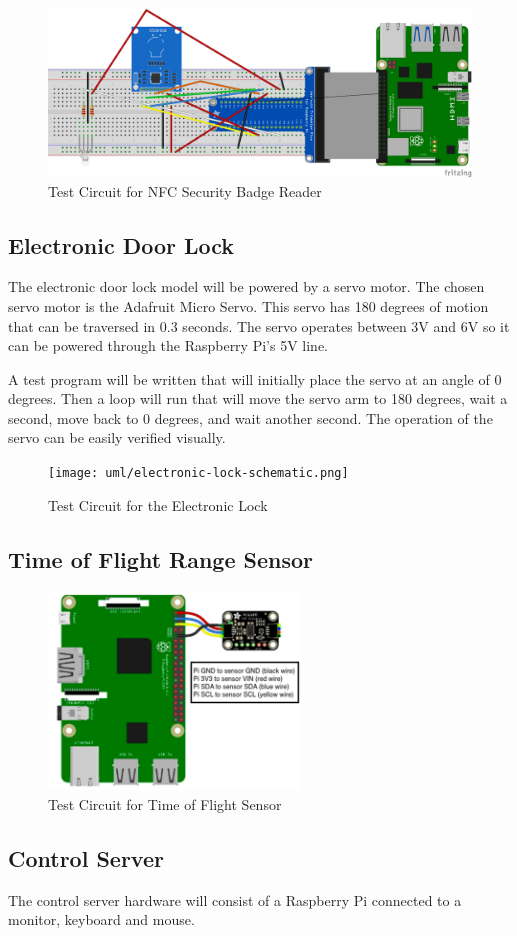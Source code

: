 \begin{figure}[!htb]
\centering
\includegraphics[width=\textwidth]{images/nfc-test-circuit.png}
\caption{Test Circuit for NFC Security Badge Reader}
\label{fig:nfc-test-circuit}
\end{figure}

\subsection{Electronic Door Lock}

The electronic door lock model will be powered by a servo motor. The chosen
servo motor is the Adafruit Micro Servo.  This servo has 180 degrees of motion
that can be traversed in 0.3 seconds.  The servo operates between 3V and 6V so
it can be powered through the Raspberry Pi's 5V line.

A test program will be written that will initially place the servo at an angle
of 0 degrees.  Then a loop will run that will move the servo arm to 180 degrees,
wait a second, move back to 0 degrees, and wait another second.  The operation
of the servo can be easily verified visually.

\begin{figure}[!htb]
\centering
\texttt{[image: uml/electronic-lock-schematic.png]}
\caption{Test Circuit for the Electronic Lock}
\label{fig:electronic-lock-schematic}
\end{figure}

\subsection{Time of Flight Range Sensor}

\begin{figure}[!htb]
\centering
\includegraphics[width=0.6\textwidth]{images/tof-test-circuit.png}
\caption{Test Circuit for Time of Flight Sensor}
\label{fig:tof-test-circuit}
\end{figure}


\subsection{Control Server}

The control server hardware will consist of a Raspberry Pi connected to a
monitor, keyboard and mouse.

